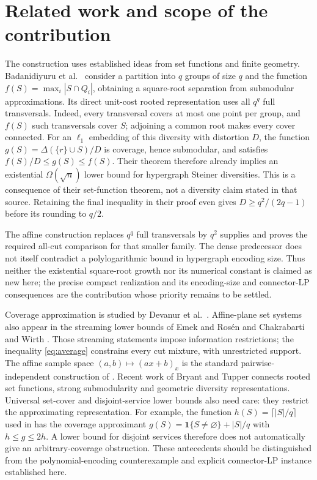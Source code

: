 \documentclass[11pt]{article}
\newcommand{\ind}{\mathbf 1}
\begin{document}
\section{Related work and scope of the contribution}\label{sec:related}
The construction uses established ideas from set functions and finite
geometry. Badanidiyuru et al.\ \cite[Appendix 6, Theorem 6.1]{SVF}
consider a partition into $q$ groups of size $q$ and the function
$f(S)=\max_i|S\cap Q_i|$, obtaining a square-root separation from
submodular approximations. Its direct unit-cost rooted representation
uses all $q^q$ full transversals. Indeed, every transversal covers at most
one point per group, and $f(S)$ such transversals cover $S$; adjoining a
common root makes every cover connected. For an $\ell_1$ embedding of this
diversity with distortion $D$, the function
$g(S)=\Delta(\{r\}\cup S)/D$ is coverage, hence submodular, and satisfies
$f(S)/D\le g(S)\le f(S)$. Their theorem therefore already implies an
existential $\Omega(\sqrt n)$ lower bound for hypergraph Steiner diversities.
This is a consequence of their set-function theorem, not a diversity claim
stated in that source. Retaining the final inequality in their proof even
gives $D\ge q^2/(2q-1)$ before its rounding to $q/2$.

The affine construction replaces $q^q$ full transversals by $q^2$ supplies
and proves the required all-cut comparison for that smaller family. The
dense predecessor does not itself contradict a polylogarithmic bound in
hypergraph encoding size. Thus neither the existential square-root growth
nor its numerical constant is claimed as new here; the precise compact
realization and its encoding-size and connector-LP consequences are the
contribution whose priority remains to be settled.

Coverage approximation is studied by Devanur et al.\ \cite{DDSSS}.
Affine-plane set systems also appear in the streaming lower bounds of
Emek and Ros\'en \cite{ER} and Chakrabarti and Wirth \cite{CW}.
Those streaming statements impose information restrictions; the inequality
\eqref{eq:average} constrains every cut mixture, with unrestricted support.
The affine sample space $(a,b)\mapsto(ax+b)_x$ is the standard
pairwise-independent construction of \cite[Sections 2.1--2.2, Claim 2.1]{LW}.
Recent work of Bryant and Tupper \cite{BT26} connects rooted set functions,
strong submodularity and geometric diversity representations.
Universal set-cover and disjoint-service lower bounds also need care:
they restrict the approximating representation. For example, the function
$h(S)=\lceil |S|/q\rceil$ used in \cite[Theorem 4.5]{JRP} has the coverage
approximant $g(S)=\ind\{S\ne\varnothing\}+|S|/q$ with $h\le g\le2h$.
A lower bound for disjoint services therefore does not automatically give
an arbitrary-coverage obstruction.
These antecedents should be distinguished from the polynomial-encoding
counterexample and explicit connector-LP instance established here.
\end{document}
